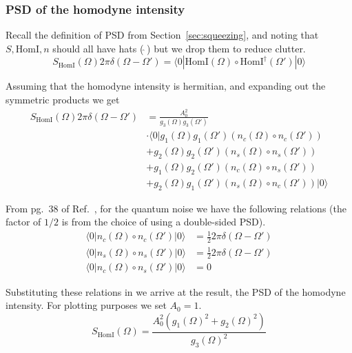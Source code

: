 \documentclass[aps,pra,superscriptaddress,reprint,nofootinbib]{revtex4-1}
\begin{document}
\subsubsection{PSD of the homodyne intensity}

Recall the definition of PSD from Section~\ref{sec:squeezing}, and noting that $S, \mathrm{HomI}, n$ should all have hats (\,$\hat{}$\,) but we drop them to reduce clutter.
$$S_\mathrm{HomI}(\Omega) 2 \pi \delta(\Omega - \Omega') = \langle0| \mathrm{HomI}(\Omega) \circ \mathrm{HomI}^\dagger(\Omega') |0\rangle$$

Assuming that the homodyne intensity is hermitian, and expanding out the symmetric products we get
\begin{align*}
S_\mathrm{HomI}(\Omega) 2 \pi \delta(\Omega - \Omega') &= \frac{A_0^2}{g_3(\Omega) g_3(\Omega')} \\
&\cdot \langle0| g_1(\Omega) g_1(\Omega') (n_c(\Omega) \circ n_c(\Omega'))\\
&+ g_2(\Omega) g_2(\Omega') (n_s(\Omega) \circ n_s(\Omega')) \\
&+ g_1(\Omega) g_2(\Omega') (n_c(\Omega) \circ n_s(\Omega')) \\
&+ g_2(\Omega) g_1(\Omega') (n_s(\Omega) \circ n_c(\Omega')) |0\rangle
\end{align*}


From pg.~38 of Ref.~\cite{Danilishin_2012}, for the quantum noise we have the following relations (the factor of $1/2$ is from the choice of using a double-sided PSD).
\begin{align*}
\langle0|n_c(\Omega) \circ n_c(\Omega')|0\rangle &= \frac{1}{2} 2 \pi \delta(\Omega - \Omega') \\
\langle0|n_s(\Omega) \circ n_s(\Omega')|0\rangle &= \frac{1}{2} 2 \pi \delta(\Omega - \Omega') \\
\langle0|n_c(\Omega) \circ n_s(\Omega')|0\rangle &= 0
\end{align*}

Substituting these relations in we arrive at the result, the PSD of the homodyne intensity. For plotting purposes we set $A_0 = 1$.
$$S_\mathrm{HomI}(\Omega) = \frac{A_0^2 \left( g_1(\Omega)^2 + g_2(\Omega)^2 \right)}{g_3(\Omega)^2}$$


\nocite{*}


\end{document}
